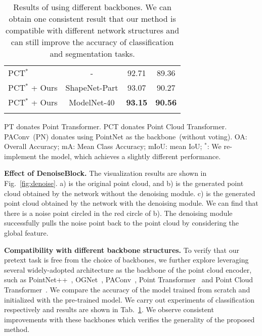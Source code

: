\documentclass[journal]{IEEEtran}
\begin{document}
\begin{table}[t]
\begin{center}
{\begin{tabular}{l|c|c|c}
\hline
{\color{black}PCT$^*$} ~\cite{guo2021pct} & {\color{black}-} & {\color{black}92.71} & {\color{black}89.36} \\
{\color{black}PCT$^*$ + Ours}  & {\color{black}ShapeNet-Part} & {\color{black}93.07} & {\color{black}90.27} \\
{\color{black}PCT$^*$ + Ours} & {\color{black}ModelNet-40} & {\color{black}\textbf{93.15}} & {\color{black}\textbf{90.56}} \\
\shline
\end{tabular}}
\end{center}
\caption{
Results of using 
different backbones.
We can obtain one consistent result that our method is compatible with different network structures and can still improve the accuracy of classification and segmentation tasks.
} 
\footnotesize{
PT donates Point Transformer. PCT donates Point Cloud Transformer. PAConv~(PN) donates using PointNet as the backbone~(without voting).
OA: Overall Accuracy;
mA: Mean Class Accuracy;
mIoU: mean IoU;
$^*$: We re-implement the model,
which achieves a slightly different performance.
}
\label{table:pointnet2}
\end{table}






\textbf{Effect of DenoiseBlock.} The visualization results are shown in  Fig.~\ref{fig:denoise}. a) is the original point cloud, and b) is the generated point cloud obtained by the network without the denoising module. c) is the generated point cloud obtained by the network with the denoising module. We can find that there is a noise point circled in the red circle of b). The denoising module successfully pulls the noise point back to the point cloud by considering the global feature. 

\textbf{Compatibility with different backbone structures.} To verify that our pretext task is free from the choice of backbones, we further explore leveraging several widely-adopted architecture as the backbone of the point cloud encoder, such as PointNet++~\cite{qi2017pointnet++}, OGNet~\cite{zheng2020parameter}, PAConv~\cite{xu2021paconv}, Point Transformer~\cite{zhao2021point} and Point Cloud Transformer~\cite{guo2021pct}.
We compare the accuracy of the model trained from scratch and initialized with the pre-trained model. We carry out experiments of classification respectively and results are shown in Tab.~\ref{table:pointnet2}. We observe consistent improvements with these backbones which verifies the generality of the proposed method. 
\end{document}
